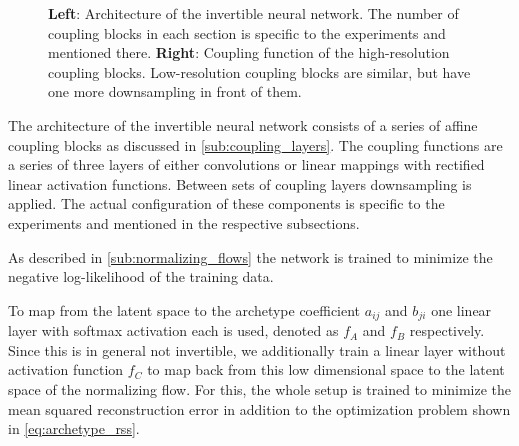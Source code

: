 \begin{figure}[htpb]
\begin{center}
\begin{subfigure}[]{0.45\textwidth}
\begin{center}
			\end{center}
		\end{subfigure}
	\end{center}
        \caption{\textbf{Left}: Architecture of the invertible neural network. The number of
		coupling blocks in each section is specific to the experiments and
            mentioned there. \textbf{Right}: Coupling function of the
        high-resolution coupling blocks. Low-resolution coupling blocks are
    similar, but have one more downsampling in front of them.}%
	\label{fig:inn_contents}
\end{figure}

The architecture of the invertible neural network consists of a series of
affine coupling blocks as discussed in \autoref{sub:coupling_layers}. The
coupling functions are a series of three layers of either convolutions or
linear mappings with rectified linear activation functions. Between sets of
coupling layers downsampling is applied. The actual configuration of these
components is specific to the experiments and mentioned in the respective
subsections.

As described in \autoref{sub:normalizing_flows} the network is trained to
minimize the negative log-likelihood of the training data.

To map from the latent space to the archetype coefficient $a_{ij}$ and $b_{ji}$
one linear layer with softmax activation each is used, denoted as $f_A$ and
$f_B$ respectively. Since this is in general not invertible, we additionally
train a linear layer without activation function $f_C$ to map back from this
low dimensional space to the latent space of the normalizing flow. For this,
the whole setup is trained to minimize the mean squared reconstruction error in
addition to the optimization problem shown in \autoref{eq:archetype_rss}.



